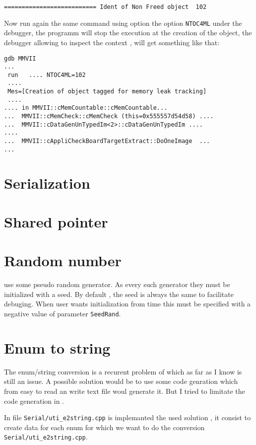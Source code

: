 \begin{verbatim}
========================== Ident of Non Freed object  102
\end{verbatim}

Now run again the same command using option the option {\tt NTOC4ML} under the debugger, the programm
will stop the execution at the creation of the object, the debugger allowing to inspect the context ,
will get something like that:

\begin{verbatim}
gdb MMVII
...
 run   .... NTOC4ML=102
 ....
 Mes=[Creation of object tagged for memory leak tracking]
 ....
.... in MMVII::cMemCountable::cMemCountable...
...  MMVII::cMemCheck::cMemCheck (this=0x555557d54d58) ....
...  MMVII::cDataGenUnTypedIm<2>::cDataGenUnTypedIm ....
....
...  MMVII::cAppliCheckBoardTargetExtract::DoOneImage  ...
...
\end{verbatim}




\section{Serialization}
\section{Shared pointer}

\section{Random number}

\PPP use some pseudo random generator. As every such generator
they must be initialized with a seed.
By default , the seed is always the same to facilitate debuging.
When user wants initialization from time this must be specified 
with a negative value of parameter {\tt  SeedRand}.



\section{Enum to string}

The enum/string  conversion is a recurent problem of \CPP which
as far as I know is still an issue. A possible solution
would be to use some code genration which from easy to read
an write text file woul generate it. But I tried to limitate
the code generation in \PPP.

In file {\tt Serial/uti\_e2string.cpp} is implemanted 
the used solution , it consist  to create data for each enum
for which we want to do the conversion {\tt Serial/uti\_e2string.cpp}.



